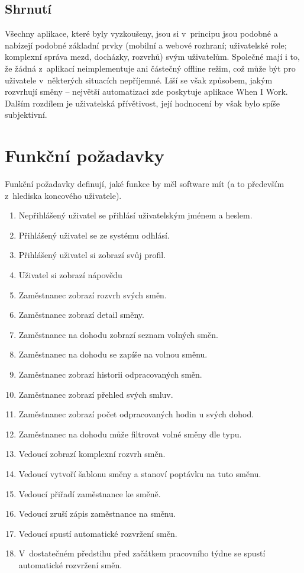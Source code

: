 \documentclass[twoside]{ctuthesis}
\begin{document}
\subsection{Shrnutí}
Všechny aplikace, které byly vyzkoušeny, jsou si v~principu jsou podobné a nabízejí podobné základní prvky (mobilní a webové rozhraní; uživatelské role; komplexní správa mezd, docházky, rozvrhů) svým uživatelům. Společné mají i to, že žádná z~aplikací neimplementuje ani částečný offline režim, což může být pro uživatele v~některých situacích nepříjemné. Liší se však způsobem, jakým rozvrhují směny -- největší automatizaci zde poskytuje aplikace When I Work. Dalším rozdílem je uživatelská přívětivost, její hodnocení by však bylo spíše subjektivní.
\newpage
\section{Funkční požadavky}\label{sec:frq}
Funkční požadavky definují, jaké funkce by měl software mít (a to především z~hlediska koncového uživatele).

\begin{enumerate}[label=\textbf{F\arabic*.}]
	\item Nepřihlášený uživatel se přihlásí uživatelským jménem a heslem.
	\item Přihlášený uživatel se ze systému odhlásí.
	\item Přihlášený uživatel si zobrazí svůj profil.
	\item Uživatel si zobrazí nápovědu
	\item Zaměstnanec zobrazí rozvrh svých směn.
	\item Zaměstnanec zobrazí detail směny.
	\item Zaměstnanec na dohodu zobrazí seznam volných směn.
	\item Zaměstnanec na dohodu se zapíše na volnou směnu.
	\item Zaměstnanec zobrazí historii odpracovaných směn.
	\item Zaměstnanec zobrazí přehled svých smluv.
	\item Zaměstnanec zobrazí počet odpracovaných hodin u svých dohod.
	\item Zaměstnanec na dohodu může filtrovat volné směny dle typu.
	\item Vedoucí zobrazí komplexní rozvrh směn.
	\item Vedoucí vytvoří šablonu směny a stanoví poptávku na tuto směnu.
	\item Vedoucí přiřadí zaměstnance ke směně.
	\item Vedoucí zruší zápis zaměstnance na směnu.
	\item Vedoucí spustí automatické rozvržení směn.
	\item V~dostatečném předstihu před začátkem pracovního týdne se spustí automatické rozvržení směn.
\end{enumerate}
\end{document}
